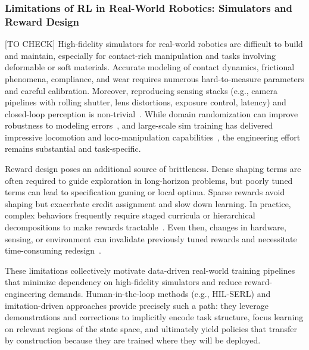 \subsubsection{Limitations of RL in Real-World Robotics: Simulators and Reward Design}
[TO CHECK]
High-fidelity simulators for real-world robotics are difficult to build and maintain, especially for contact-rich manipulation and tasks involving deformable or soft materials. Accurate modeling of contact dynamics, frictional phenomena, compliance, and wear requires numerous hard-to-measure parameters and careful calibration. Moreover, reproducing sensing stacks (e.g., camera pipelines with rolling shutter, lens distortions, exposure control, latency) and closed-loop perception is non-trivial~\citep{bekrisStateRobotMotion2024,sicilianoSpringerHandbookRobotics2016}. While domain randomization can improve robustness to modeling errors~\citep{akkayaSolvingRubiksCube2019}, and large-scale sim training has delivered impressive locomotion and loco-manipulation capabilities~\citep{hwangboLearningAgileDynamic2019,leeLearningQuadrupedalLocomotion2020,jiDribbleBotDynamicLegged2023}, the engineering effort remains substantial and task-specific.

Reward design poses an additional source of brittleness. Dense shaping terms are often required to guide exploration in long-horizon problems, but poorly tuned terms can lead to specification gaming or local optima. Sparse rewards avoid shaping but exacerbate credit assignment and slow down learning. In practice, complex behaviors frequently require staged curricula or hierarchical decompositions to make rewards tractable~\citep{zhangWoCoCoLearningWholeBody2024,leeLearningQuadrupedalLocomotion2020}. Even then, changes in hardware, sensing, or environment can invalidate previously tuned rewards and necessitate time-consuming redesign~\citep{tangDeepReinforcementLearning2025a}.

These limitations collectively motivate data-driven real-world training pipelines that minimize dependency on high-fidelity simulators and reduce reward-engineering demands. Human-in-the-loop methods (e.g., HIL-SERL) and imitation-driven approaches provide precisely such a path: they leverage demonstrations and corrections to implicitly encode task structure, focus learning on relevant regions of the state space, and ultimately yield policies that transfer by construction because they are trained where they will be deployed.
